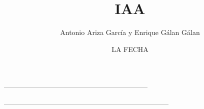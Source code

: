 \documentclass[11pt,a4paper,twoside,openany]{book}
\author{Antonio Ariza García y Enrique Gálan Gálan}
\title{IAA}
\date{LA FECHA}
\begin{document}
\frontmatter



\tableofcontents
\listoffigures

\mainmatter






 --------------------------------------------------------------

\backmatter


\nocite{*}
 -----------------------------------------------------------------------
\end{document}
